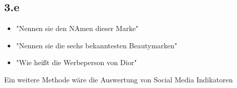 \subsection{3.e}
    \begin{itemize}
        \item "Nennen sie den NAmen dieser Marke"
        \item "Nennen sie die sechs bekanntesten Beautymarken"
        \item "Wie heißt die Werbeperson von Dior"
    \end{itemize}

    Ein weitere Methode wäre die Auswertung von Social Media Indikatoren